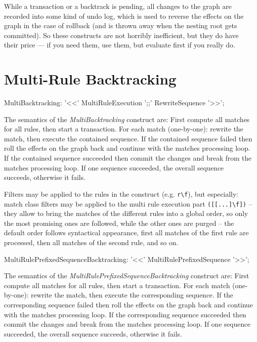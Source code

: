 \begin{note}
While a transaction or a backtrack is pending, all changes to the graph are recorded into some kind of undo log, which is used to reverse the effects on the graph in the case of rollback (and is thrown away when the nesting root gets committed).
So these constructs are not horribly inefficient, but they do have their price --- if you need them, use them, but evaluate first if you really do.
\end{note}


\section{Multi-Rule Backtracking}\label{sec:multitransaction}

\begin{rail}
  MultiBacktracking: '<<' MultiRuleExecution ';;' RewriteSequence '>>';
\end{rail}

The semantics of the \emph{MultiBacktracking} construct are:
First compute all matches for all rules, then start a transaction.
For each match (one-by-one): rewrite the match, then execute the contained sequence.
If the contained sequence failed then roll the effects on the graph back and continue with the matches processing loop.
If the contained sequence succeeded then commit the changes and break from the matches processing loop.
If one sequence succeeded, the overall sequence succeeds, otherwise it fails.

Filters may be applied to the rules in the construct (e.g. \verb#r\f#), but especially: match class filters may be applied to the multi rule execution part \verb#([[...]\f])# -- they allow to bring the matches of the different rules into a global order, so only the most promising ones are followed, while the other ones are purged -- the default order follows syntactical appearance, first all matches of the first rule are processed, then all matches of the second rule, and so on.

\begin{rail}
  MultiRulePrefixedSequenceBacktracking: '<<' MultiRulePrefixedSequence '>>';
\end{rail}

The semantics of the \emph{MultiRulePrefixedSequenceBacktracking} construct are:
First compute all matches for all rules, then start a transaction.
For each match (one-by-one): rewrite the match, then execute the corresponding sequence.
If the corresponding sequence failed then roll the effects on the graph back and continue with the matches processing loop.
If the corresponding sequence succeeded then commit the changes and break from the matches processing loop.
If one sequence succeeded, the overall sequence succeeds, otherwise it fails.


